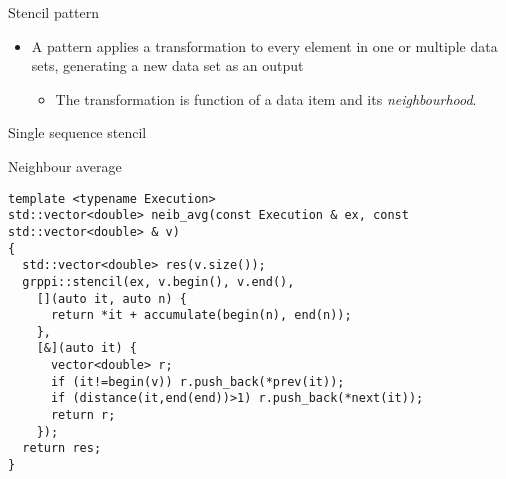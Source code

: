 \begin{frame}[t]{Stencil pattern}
\begin{itemize}
  \item A  pattern applies a transformation to every 
        element in one or multiple data sets, generating a new data set as an output
    \begin{itemize}
      \item The transformation is function of a data item and its \emph{neighbourhood}.
    \end{itemize}
\end{itemize}
\end{frame}

\begin{frame}[t,fragile]{Single sequence stencil}
\begin{block}{Neighbour average}
\begin{lstlisting}
template <typename Execution>
std::vector<double> neib_avg(const Execution & ex, const std::vector<double> & v)
{
  std::vector<double> res(v.size());
  grppi::stencil(ex, v.begin(), v.end(), 
    [](auto it, auto n) {
      return *it + accumulate(begin(n), end(n)); 
    },
    [&](auto it) {
      vector<double> r;
      if (it!=begin(v)) r.push_back(*prev(it));
      if (distance(it,end(end))>1) r.push_back(*next(it));
      return r;
    });
  return res;
}
\end{lstlisting}
\end{block}
\end{frame}

